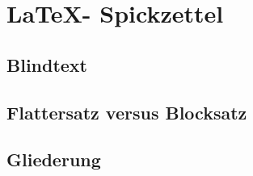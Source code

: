 %
\section{\LaTeX - Spickzettel}\label{sec:LaTeX-Spickzettel}

\subsection{Blindtext}\label{sec:blindtext}

\blindtext[1] 

\blindtext[1]

\subsection{Flattersatz versus Blocksatz}\label{sec:Flattersatz-versus-Blocksatz}

\begin{flushleft}
\blindtext[1]
\end{flushleft}

\begin{flushright}
\blindtext[1]
\end{flushright}

\begin{center}
\blindtext[1]
\end{center}

\newpage

\subsection{Gliederung}

